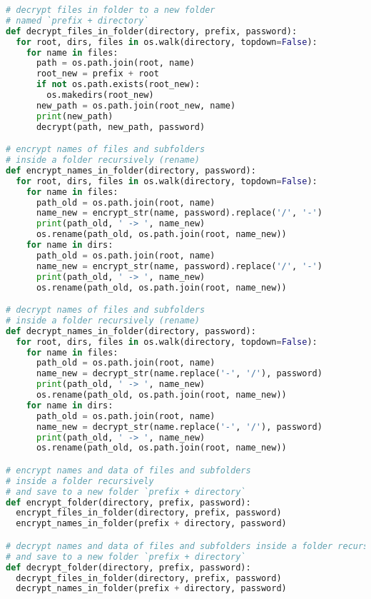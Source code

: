 \begin{lstlisting}[language=python]
# decrypt files in folder to a new folder
# named `prefix + directory`
def decrypt_files_in_folder(directory, prefix, password):
  for root, dirs, files in os.walk(directory, topdown=False):
    for name in files:
      path = os.path.join(root, name)
      root_new = prefix + root
      if not os.path.exists(root_new):
        os.makedirs(root_new)
      new_path = os.path.join(root_new, name)
      print(new_path)
      decrypt(path, new_path, password)

# encrypt names of files and subfolders
# inside a folder recursively (rename)
def encrypt_names_in_folder(directory, password):
  for root, dirs, files in os.walk(directory, topdown=False):
    for name in files:
      path_old = os.path.join(root, name)
      name_new = encrypt_str(name, password).replace('/', '-')
      print(path_old, ' -> ', name_new)
      os.rename(path_old, os.path.join(root, name_new))
    for name in dirs:
      path_old = os.path.join(root, name)
      name_new = encrypt_str(name, password).replace('/', '-')
      print(path_old, ' -> ', name_new)
      os.rename(path_old, os.path.join(root, name_new))

# decrypt names of files and subfolders
# inside a folder recursively (rename)
def decrypt_names_in_folder(directory, password):
  for root, dirs, files in os.walk(directory, topdown=False):
    for name in files:
      path_old = os.path.join(root, name)
      name_new = decrypt_str(name.replace('-', '/'), password)
      print(path_old, ' -> ', name_new)
      os.rename(path_old, os.path.join(root, name_new))
    for name in dirs:
      path_old = os.path.join(root, name)
      name_new = decrypt_str(name.replace('-', '/'), password)
      print(path_old, ' -> ', name_new)
      os.rename(path_old, os.path.join(root, name_new))

# encrypt names and data of files and subfolders
# inside a folder recursively
# and save to a new folder `prefix + directory`
def encrypt_folder(directory, prefix, password):
  encrypt_files_in_folder(directory, prefix, password)
  encrypt_names_in_folder(prefix + directory, password)

# decrypt names and data of files and subfolders inside a folder recursively
# and save to a new folder `prefix + directory`
def decrypt_folder(directory, prefix, password):
  decrypt_files_in_folder(directory, prefix, password)
  decrypt_names_in_folder(prefix + directory, password)
\end{lstlisting}
